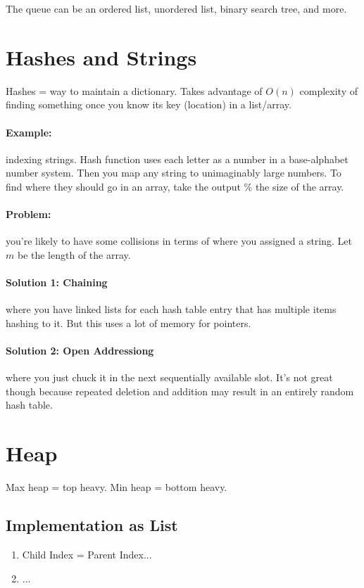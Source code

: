 \documentclass[a4paper,12pt]{report}
\begin{document}
The queue can be an ordered list, unordered list, binary search tree, and more. 

\section{Hashes and Strings}
Hashes = way to maintain a dictionary. Takes advantage of $O(n)$ complexity of finding something once you know its key (location) in a list/array. 

\paragraph{Example: } indexing strings. Hash function uses each letter as a number in a base-alphabet number system. Then you map any string to unimaginably large numbers. To find where they should go in an array, take the output \% the size of the array.

\paragraph{Problem: } you're likely to have some collisions in terms of where you assigned a string. Let $m$ be the length of the array. 

\paragraph{Solution 1: Chaining } where you have linked lists for each hash table entry that has multiple items hashing to it. But this uses a lot of memory for pointers.

\paragraph{Solution 2: Open Addressiong } where you just chuck it in the next sequentially available slot. It's not great though because repeated deletion and addition may result in an entirely random hash table.  

\section{Heap}
Max heap = top heavy. Min heap = bottom heavy.
\subsection{Implementation as List}
\begin{enumerate}
\item Child Index = Parent Index...
\item ...
\end{enumerate}
\end{document}

